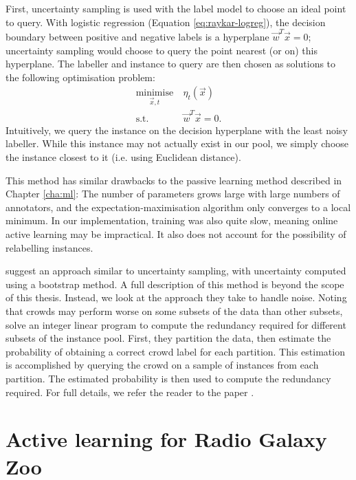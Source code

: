     First, uncertainty sampling is used with the label model to choose an ideal
    point to query. With logistic regression (Equation \ref{eq:raykar-logreg}),
    the decision boundary between positive and negative labels is a hyperplane
    $\vec w^T \vec x = 0$; uncertainty sampling would choose to query the point
    nearest (or on) this hyperplane. The labeller and instance to query are then
    chosen as solutions to the following optimisation problem:
    \begin{align*}
        \underset{\vec x, t}{\text{minimise}}\ & \eta_t(\vec x)\\
        \text{s.t. } & \vec w^T \vec x = 0.
    \end{align*}
    Intuitively, we query the instance on the decision hyperplane with the least
    noisy labeller. While this instance may not actually exist in our pool, we
    simply choose the instance closest to it (i.e. using Euclidean distance).

    This method has similar drawbacks to the \citeauthor{yan10} passive learning
    method described in Chapter \ref{cha:ml}: The number of parameters grows
    large with large numbers of annotators, and the expectation-maximisation
    algorithm only converges to a local minimum. In our implementation, training
    was also quite slow, meaning online active learning may be impractical. It
    also does not account for the possibility of relabelling instances.

    \citet{mozafari12} suggest an approach similar to uncertainty sampling, with
    uncertainty computed using a bootstrap method. A full description of this
    method is beyond the scope of this thesis. Instead, we look at the approach
    they take to handle noise. Noting that crowds may perform worse on some
    subsets of the data than other subsets, \citeauthor{mozafari12} solve an
    integer linear program to compute the redundancy required for different
    subsets of the instance pool. First, they partition the data, then estimate
    the probability of obtaining a correct crowd label for each partition. This
    estimation is accomplished by querying the crowd on a sample of instances
    from each partition. The estimated probability is then used to compute the
    redundancy required. For full details, we refer the reader to the paper
    \citep{mozafari12}.

\section{Active learning for Radio Galaxy Zoo}
\label{sec:al-rgz-ideal-experiment}
    
